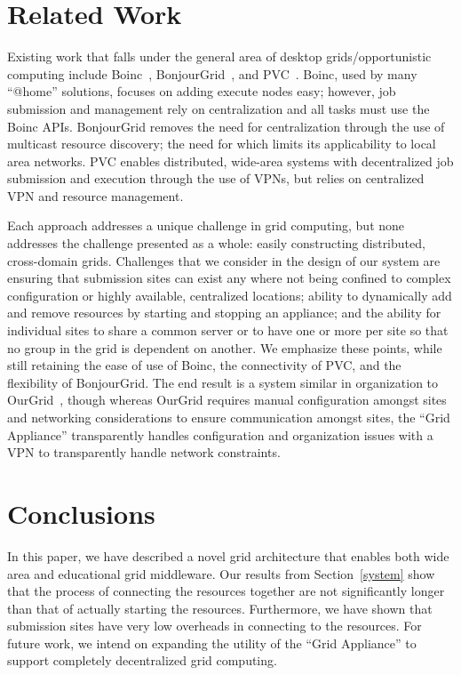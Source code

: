 \documentclass[conference]{IEEEtran}
\begin{document}
\section{Related Work}
\label{related_work}

Existing work that falls under the general area of desktop grids/opportunistic
computing include Boinc~\cite{boinc}, BonjourGrid~\cite{bonjourgrid}, and
PVC~\cite{pvc}.  Boinc, used by many ``@home'' solutions, focuses on adding
execute nodes easy; however, job submission and management rely on
centralization and all tasks must use the Boinc APIs.  BonjourGrid removes the
need for centralization through the use of multicast resource discovery; the
need for which limits its applicability to local area networks.  PVC enables
distributed, wide-area systems with decentralized job submission and execution
through the use of VPNs, but relies on centralized VPN and resource management.

Each approach addresses a unique challenge in grid computing, but none
addresses the challenge presented as a whole: easily constructing distributed,
cross-domain grids.  Challenges that we consider in the design of our system
are ensuring that submission sites can exist any where not being confined to
complex configuration or highly available, centralized locations; ability to
dynamically add and remove resources by starting and stopping an appliance; and
the ability for individual sites to share a common server or to have one or
more per site so that no group in the grid is dependent on another.  We
emphasize these points, while still retaining the ease of use of Boinc, the
connectivity of PVC, and the flexibility of BonjourGrid.  The end result is a
system similar in organization to OurGrid~\cite{ourgrid}, though whereas OurGrid
requires manual configuration amongst sites and networking considerations to
ensure communication amongst sites, the ``Grid Appliance'' transparently handles
configuration and organization issues with a VPN to transparently handle network
constraints.

\section{Conclusions}
\label{conclusions}

In this paper, we have described a novel grid architecture that enables both
wide area and educational grid middleware.  Our results from
Section~\ref{system} show that the process of connecting the resources together
are not significantly longer than that of actually starting the resources.
Furthermore, we have shown that submission sites have very low overheads in
connecting to the resources.  For future work, we intend on expanding the
utility of the ``Grid Appliance'' to support completely decentralized grid
computing.
\end{document}
